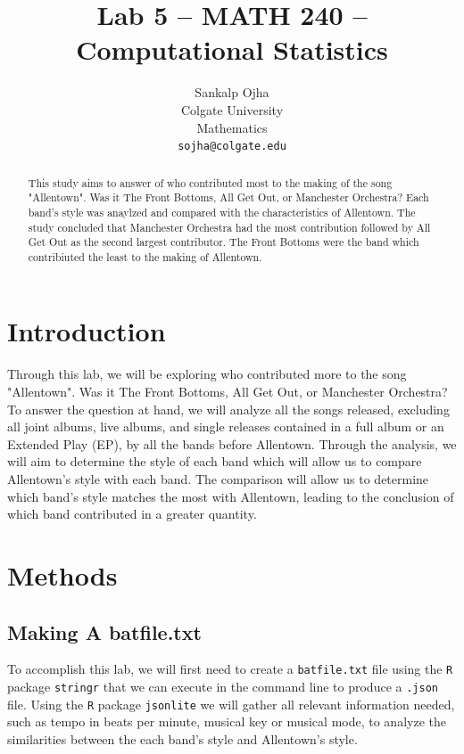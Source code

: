 \documentclass{article}\usepackage[]{graphicx}\usepackage[]{xcolor}
\begin{document}
\vspace{-1in}
\title{Lab 5 -- MATH 240 -- Computational Statistics}

\author{
  Sankalp Ojha \\
  Colgate University  \\
  Mathematics  \\
  {\tt sojha@colgate.edu}
}

\date{}

\maketitle

\begin{multicols}{2}
\begin{abstract}
This study aims to answer of who contributed most to the making of the song "Allentown". Was it The Front Bottoms, All Get Out, or Manchester Orchestra? Each band's style was anaylzed and compared with the characteristics of Allentown. The study concluded that Manchester Orchestra had the most contribution followed by All Get Out as the second largest contributor. The Front Bottoms were the band which contribiuted the least to the making of Allentown.
\end{abstract}

\section{Introduction}
Through this lab, we will be exploring who contributed more to the song "Allentown". Was it The Front Bottoms, All Get Out, or Manchester Orchestra? To answer the question at hand, we will analyze all the songs released, excluding all joint albums, live albums, and single releases contained in a full album or an Extended Play (EP), by all the bands before Allentown. Through the analysis, we will aim to determine the style of each band which will allow us to compare Allentown's style with each band. The comparison will allow us to determine which band's style matches the most with Allentown, leading to the conclusion of which band contributed in a greater quantity.

\section{Methods}

\subsection{Making A batfile.txt}
To accomplish this lab, we will first need to create a \texttt{batfile.txt} file using the \texttt{R} package \texttt{stringr} \citep{stringr} that we can execute in the command line to produce a \texttt{.json} file. Using the \texttt{R} package \texttt{jsonlite} \citep{jsonlite} we will gather all relevant information needed, such as tempo in beats per minute, musical key or musical mode, to analyze the similarities between the each band's style and Allentown's style. 


\end{multicols}
\end{document}
